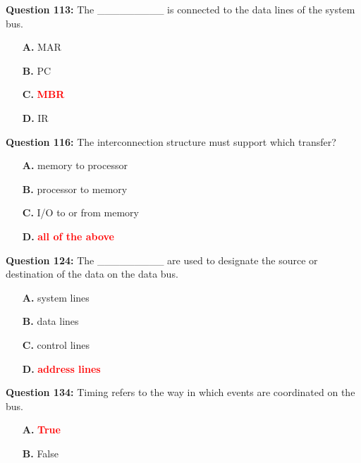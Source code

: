 \documentclass[12pt,a4paper]{article}
\begin{document}
\vspace{0.5cm}

\textbf{Question 113:} The _________ is connected to the data lines of the system bus.

\begin{itemize}
    \item[\textbf{A.}] MAR
    \item[\textbf{B.}] PC
    \item[\textbf{C.}] \textcolor{red}{\textbf{MBR}}
    \item[\textbf{D.}] IR
\end{itemize}

\vspace{0.5cm}

\textbf{Question 116:} The interconnection structure must support which transfer?

\begin{itemize}
    \item[\textbf{A.}] memory to processor
    \item[\textbf{B.}] processor to memory
    \item[\textbf{C.}] I/O to or from memory
    \item[\textbf{D.}] \textcolor{red}{\textbf{all of the above}}
\end{itemize}

\vspace{0.5cm}

\textbf{Question 124:} The _________ are used to designate the source or destination of the data on the data bus.

\begin{itemize}
    \item[\textbf{A.}] system lines
    \item[\textbf{B.}] data lines
    \item[\textbf{C.}] control lines
    \item[\textbf{D.}] \textcolor{red}{\textbf{address lines}}
\end{itemize}

\vspace{0.5cm}

\textbf{Question 134:} Timing refers to the way in which events are coordinated on the bus.

\begin{itemize}
    \item[\textbf{A.}] \textcolor{red}{\textbf{True}}
    \item[\textbf{B.}] False
\end{itemize}
\end{document}
